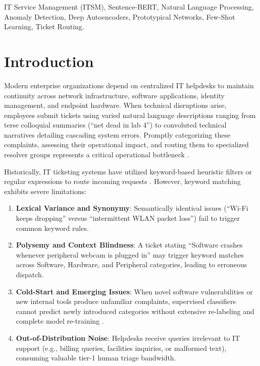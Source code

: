 \documentclass[conference]{IEEEtran}
\begin{document}
\begin{IEEEkeywords}
IT Service Management (ITSM), Sentence-BERT, Natural Language Processing, Anomaly Detection, Deep Autoencoders, Prototypical Networks, Few-Shot Learning, Ticket Routing.
\end{IEEEkeywords}

\section{Introduction}
Modern enterprise organizations depend on centralized IT helpdesks to maintain continuity across network infrastructure, software applications, identity management, and endpoint hardware. When technical disruptions arise, employees submit tickets using varied natural language descriptions ranging from terse colloquial summaries (``net dead in lab 4'') to convoluted technical narratives detailing cascading system errors. Promptly categorizing these complaints, assessing their operational impact, and routing them to specialized resolver groups represents a critical operational bottleneck \cite{brenner2007}.

Historically, IT ticketing systems have utilized keyword-based heuristic filters or regular expressions to route incoming requests \cite{agarwal2012}. However, keyword matching exhibits severe limitations:
\begin{enumerate}
    \item \textbf{Lexical Variance and Synonymy}: Semantically identical issues (``Wi-Fi keeps dropping'' versus ``intermittent WLAN packet loss'') fail to trigger common keyword rules.
    \item \textbf{Polysemy and Context Blindness}: A ticket stating ``Software crashes whenever peripheral webcam is plugged in'' may trigger keyword matches across Software, Hardware, and Peripheral categories, leading to erroneous dispatch.
    \item \textbf{Cold-Start and Emerging Issues}: When novel software vulnerabilities or new internal tools produce unfamiliar complaints, supervised classifiers cannot predict newly introduced categories without extensive re-labeling and complete model re-training \cite{shao2019}.
    \item \textbf{Out-of-Distribution Noise}: Helpdesks receive queries irrelevant to IT support (e.g., billing queries, facilities inquiries, or malformed text), consuming valuable tier-1 human triage bandwidth.
\end{enumerate}
\end{document}
